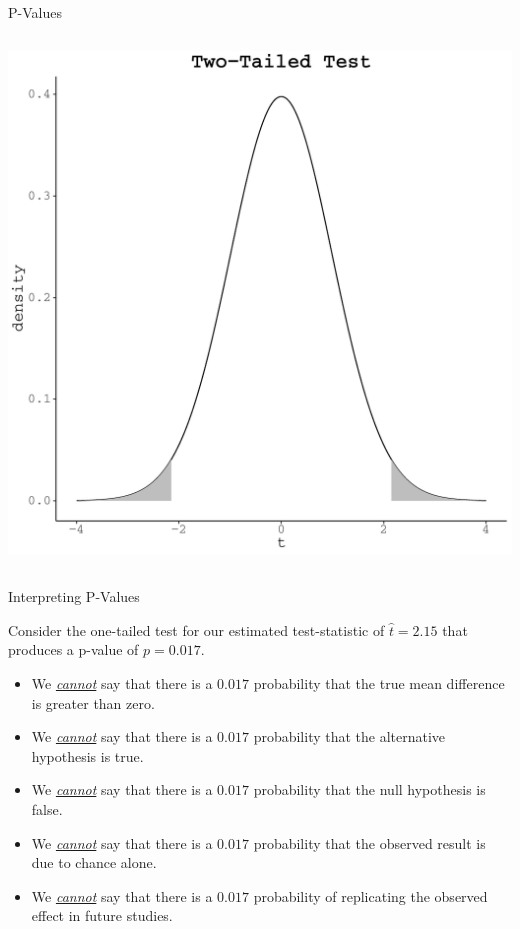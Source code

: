 \documentclass[10pt]{beamer}\usepackage[]{graphicx}\usepackage[]{color}
\makeatletter
\def\maxwidth{ %
  \ifdim\Gin@nat@width>\linewidth
    \linewidth
  \else
    \Gin@nat@width
  \fi
}
\newenvironment{knitrout}{}{} %
\makeatother
\begin{document}
\begin{frame}[fragile]{P-Values}
\begin{columns}
\begin{column}{0.5\textwidth}
\begin{knitrout}
{\centering \includegraphics[width=\maxwidth]{figure/unnamed-chunk-14-1} 

}


\end{knitrout}

    \end{column}
  \end{columns}

\end{frame}

\watermarkon %

\begin{frame}{Interpreting P-Values}



Consider the one-tailed test for our estimated test-statistic of $\hat{t} =
2.15$ that produces a p-value of $p = 0.017$.
\vc
\begin{itemize}
\item We \emph{\underline{cannot}} say that there is a $0.017$
  probability that the true mean difference is greater than zero.
  \vc
\item We \emph{\underline{cannot}} say that there is a $0.017$
  probability that the alternative hypothesis is true.
  \vc
\item We \emph{\underline{cannot}} say that there is a $0.017$
  probability that the null hypothesis is false.
  \vc
\item We \emph{\underline{cannot}} say that there is a $0.017$
  probability that the observed result is due to chance alone.
  \vc
\item We \emph{\underline{cannot}} say that there is a $0.017$
  probability of replicating the observed effect in future studies.
\end{itemize}

\end{frame}
\end{document}
